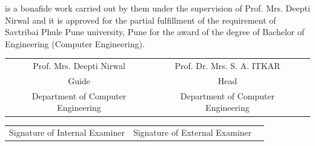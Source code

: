 \documentclass[twoside,a4paper,12pt]{book}
\begin{document}
is a bonafide work carried out by them under the supervision of Prof. Mrs. Deepti Nirwal and it is approved for the partial fulfillment of the requirement of Savtribai Phule Pune university, Pune for the award of the degree of Bachelor of Engineering (Computer Engineering).\\
\vspace*{1\baselineskip}
 
\bgroup
\def\arraystretch{0.7}
\vspace*{0.5\baselineskip}
\begin{tabular}{c c c}
Prof. Mrs. Deepti Nirwal &  \hspace*{2mm} Prof. Dr. Mrs. S. A. ITKAR & \\									
Guide   &  \hspace*{2mm} Head \\
Department of Computer Engineering  & \hspace*{5mm} Department of Computer Engineering  & \\
\end{tabular}
\vspace*{0.5\baselineskip} 
\begin{center}
{


}
\end{center}
\vspace*{4\baselineskip}
\begin{tabular}{c c c}
\hspace*{6mm}Signature of Internal Examiner&  \hspace*{18mm} Signature of External Examiner & \\
\end{tabular}





\newpage
\end{document}

